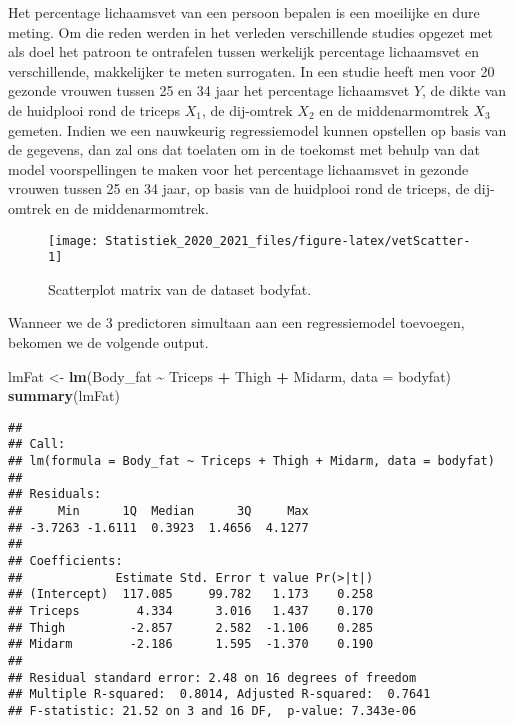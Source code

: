 \documentclass[
  12pt,dutch,coursenotes]{book}
\newenvironment{Shaded}{\begin{snugshade}}{\end{snugshade}}
\newcommand{\DataTypeTok}[1]{\textcolor[rgb]{0.13,0.29,0.53}{#1}}
\newcommand{\KeywordTok}[1]{\textcolor[rgb]{0.13,0.29,0.53}{\textbf{#1}}}
\newcommand{\NormalTok}[1]{#1}
\newcommand{\OperatorTok}[1]{\textcolor[rgb]{0.81,0.36,0.00}{\textbf{#1}}}
\newcommand{\StringTok}[1]{\textcolor[rgb]{0.31,0.60,0.02}{#1}}
\theoremstyle{definition}
\theoremstyle{definition}
\theoremstyle{definition}
\theoremstyle{remark}
\begin{document}
Het percentage lichaamsvet van een persoon bepalen is een moeilijke en dure meting.
Om die reden werden in het verleden verschillende studies opgezet met als doel het patroon te ontrafelen tussen werkelijk percentage lichaamsvet en verschillende, makkelijker te meten surrogaten.
In een studie heeft men voor
20 gezonde vrouwen tussen 25 en 34 jaar het percentage lichaamsvet \(Y\), de dikte van de huidplooi rond de triceps \(X_1\), de dij-omtrek \(X_2\) en de middenarmomtrek \(X_3\) gemeten.
Indien we een nauwkeurig regressiemodel kunnen opstellen op basis van de gegevens, dan zal ons dat toelaten om in de toekomst met behulp van dat model voorspellingen te maken voor het percentage lichaamsvet in gezonde vrouwen tussen 25 en 34 jaar, op basis van de huidplooi rond de triceps, de dij-omtrek en de middenarmomtrek.

\begin{figure}

{\centering \texttt{[image: Statistiek\_2020\_2021\_files/figure-latex/vetScatter-1]} 

}

\caption{Scatterplot matrix van de dataset bodyfat.}\label{fig:vetScatter}
\end{figure}

Wanneer we de 3 predictoren simultaan aan een regressiemodel toevoegen, bekomen we de volgende output.

\begin{Shaded}
\begin{Highlighting}[]
\NormalTok{lmFat \textless{}{-}}\StringTok{ }\KeywordTok{lm}\NormalTok{(Body\_fat }\OperatorTok{\textasciitilde{}}\StringTok{ }\NormalTok{Triceps }\OperatorTok{+}\StringTok{ }\NormalTok{Thigh }\OperatorTok{+}\StringTok{ }\NormalTok{Midarm, }\DataTypeTok{data =}\NormalTok{ bodyfat)}
\KeywordTok{summary}\NormalTok{(lmFat)}
\end{Highlighting}
\end{Shaded}

\begin{verbatim}
## 
## Call:
## lm(formula = Body_fat ~ Triceps + Thigh + Midarm, data = bodyfat)
## 
## Residuals:
##     Min      1Q  Median      3Q     Max 
## -3.7263 -1.6111  0.3923  1.4656  4.1277 
## 
## Coefficients:
##             Estimate Std. Error t value Pr(>|t|)
## (Intercept)  117.085     99.782   1.173    0.258
## Triceps        4.334      3.016   1.437    0.170
## Thigh         -2.857      2.582  -1.106    0.285
## Midarm        -2.186      1.595  -1.370    0.190
## 
## Residual standard error: 2.48 on 16 degrees of freedom
## Multiple R-squared:  0.8014, Adjusted R-squared:  0.7641 
## F-statistic: 21.52 on 3 and 16 DF,  p-value: 7.343e-06
\end{verbatim}
\end{document}
